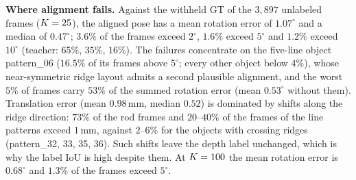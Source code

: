 \noindent\textbf{Where alignment fails.} Against the withheld GT of the $3{,}897$ unlabeled frames ($K=25$), the aligned pose has a mean rotation error of $1.07^\circ$ and a median of $0.47^\circ$; $3.6\%$ of the frames exceed $2^\circ$, $1.6\%$ exceed $5^\circ$ and $1.2\%$ exceed $10^\circ$ (teacher: $65\%$, $35\%$, $16\%$). The failures concentrate on the five-line object pattern\_06 ($16.5\%$ of its frames above $5^\circ$; every other object below $4\%$), whose near-symmetric ridge layout admits a second plausible alignment, and the worst $5\%$ of frames carry $53\%$ of the summed rotation error (mean $0.53^\circ$ without them). Translation error (mean $0.98\,$mm, median $0.52$) is dominated by shifts along the ridge direction: $73\%$ of the rod frames and $20$--$40\%$ of the frames of the line patterns exceed $1\,$mm, against $2$--$6\%$ for the objects with crossing ridges (pattern\_32, 33, 35, 36). Such shifts leave the depth label unchanged, which is why the label IoU is high despite them. At $K=100$ the mean rotation error is $0.68^\circ$ and $1.3\%$ of the frames exceed $5^\circ$.

